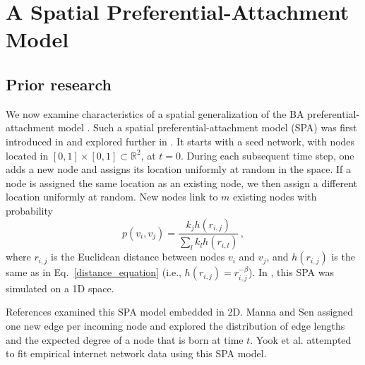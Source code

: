 \documentclass[%
 reprint,
 amsmath,amssymb,
 aps,
]{revtex4-1}
\begin{document}
\section{A Spatial Preferential-Attachment Model} \label{sec:ba-model}

\subsection{Prior research} \label{prior}

We now examine characteristics of a spatial generalization of the BA preferential-attachment model \cite{BA}. Such a spatial preferential-attachment model (SPA) was first introduced in \cite{SPA1} and explored further in \cite{SPA2, SPA3, SPA4}. It starts with a seed network, with nodes located in $[0, 1] \times [0, 1] \subset \mathbb{R}^2$, at $t=0$. During each subsequent time step, one adds a new node and assigns its location uniformly at random in the space. If a node is assigned the same location as an existing node, we then assign a different location uniformly at random. New nodes link to $m$ existing nodes with probability 
\begin{equation}\label{spatialpreferential_prior}
    p(v_i,v_j) = \frac{k_j h(r_{i, j})}{\sum_l k_l h(r_{i,l})}\,,
\end{equation}
where $r_{i,j}$ is the Euclidean distance between nodes $v_i$ and $v_j$, and $h(r_{i,j})$ is the same as in Eq.~\eqref{distance_equation} (i.e., $h(r_{i,j}) = r_{i,j}^{-\beta}$). In \cite{SPA1}, this SPA was simulated on a 1D space. 



References \cite{SPA2, SPA3} examined this SPA model embedded in 2D. Manna and Sen \cite{SPA2} assigned one new edge per incoming node and explored the distribution of edge lengths and the expected degree of a node that is born at time $t$. Yook et al. \cite{SPA3} attempted to fit empirical internet network data using this SPA model.
\end{document}
